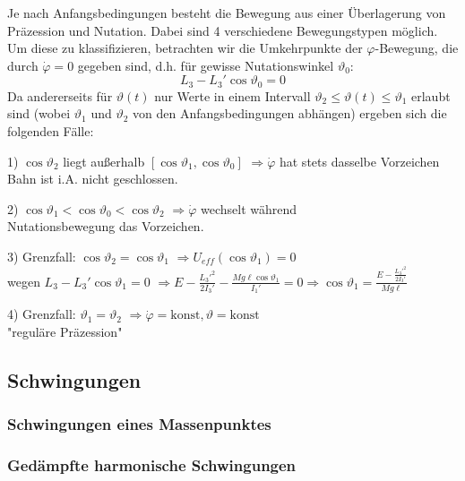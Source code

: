 \documentclass[10pt, letterpaper]{article}
\begin{document}
Je nach Anfangsbedingungen besteht die Bewegung aus einer Überlagerung von Präzession und Nutation. Dabei sind 4 verschiedene Bewegungstypen möglich. Um diese zu klassifizieren, betrachten wir die Umkehrpunkte der $\varphi$-Bewegung, die durch $\dot{\varphi}=0$ gegeben sind, d.h. für gewisse Nutationswinkel $\vartheta_0$:
\[L_3-L_3' \cos\vartheta_0 = 0\]
Da andererseits für $\vartheta(t)$ nur Werte in einem Intervall $\vartheta_2 \leq \vartheta(t) \leq \vartheta_1$ erlaubt sind (wobei $\vartheta_1$ und $\vartheta_2$ von den Anfangsbedingungen abhängen) ergeben sich die folgenden Fälle:

1) $\cos\vartheta_2$ liegt außerhalb $[\cos\vartheta_1, \cos\vartheta_0]$
   $\Rightarrow \dot{\varphi}$ hat stets dasselbe Vorzeichen\\
   Bahn ist i.A. nicht geschlossen.

2) $\cos\vartheta_1 < \cos\vartheta_0 < \cos\vartheta_2$
   $\Rightarrow \dot{\varphi}$ wechselt während\\
   Nutationsbewegung das Vorzeichen.

3) Grenzfall: $\cos\vartheta_2 = \cos\vartheta_1$
   $\Rightarrow U_{eff}(\cos\vartheta_1) = 0$\\
   wegen $L_3-L_3'\cos\vartheta_1 = 0$
   $\Rightarrow E - \frac{L_3'^2}{2I_3'} - \frac{Mg\ell\cos\vartheta_1}{I_1'} = 0 \Rightarrow \cos\vartheta_1 = \frac{E - \frac{L_3'^2}{2I_3'}}{Mg\ell}$

4) Grenzfall: $\vartheta_1 = \vartheta_2$
   $\Rightarrow \dot{\varphi} = \text{konst}, \vartheta = \text{konst}$\\
   "reguläre Präzession"







\pagebreak




\subsection{Schwingungen}

\subsubsection{Schwingungen eines Massenpunktes}

\subsubsection*{Gedämpfte harmonische Schwingungen}
\end{document}
